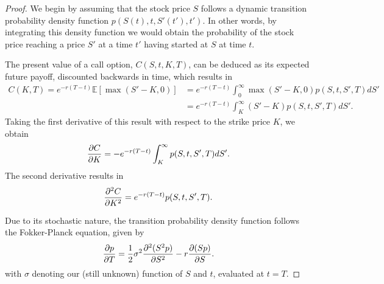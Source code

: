 \begin{proof}

We begin by assuming that the stock price $S$ follows a dynamic transition probability density function $p(S(t),t,S'(t'),t')$. In other words, by integrating this density function we would obtain the probability of the stock price reaching a price $S'$ at a time $t'$ having started at $S$ at time $t$.

The present value of a call option, $C(S,t,K,T)$, can be deduced as its expected future payoff, discounted backwards in time, which results in
\begin{equation}
\begin{split}\label{deriv0}
C(K,T)=e^{-r(T-t)}\mathbb{E}\left[\max\left(S'-K,0\right)\right]&=e^{-r(T-t)}\int_0^\infty\max\left(S'-K,0\right)p(S,t,S',T)dS'\\
&=e^{-r(T-t)}\int_K^\infty(S'-K)p(S,t,S',T)dS'.
\end{split}
\end{equation}
Taking the first derivative of this result with respect to the strike price $K$, we obtain
\begin{equation}
\pdv{C}{K}=-e^{-r(T-t)}\int_K^\infty p(S,t,S',T)dS'.
\end{equation}
The second derivative results in
\begin{equation}
\pdv{^2C}{K^2}=e^{-r(T-t)}p(S,t,S',T).
\end{equation}

Due to its stochastic nature, the transition probability density function follows the Fokker-Planck equation, given by
\begin{equation}\label{FokkerPlanck}
\pdv{p}{T}=\frac{1}{2}\sigma^2\pdv{^2(S^2p)}{S^2}-r\pdv{(Sp)}{S}.
\end{equation}
\noindent with $\sigma$ denoting our (still unknown) function of $S$ and $t$, evaluated at $t=T$.


\end{proof}
